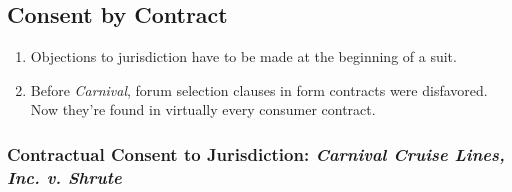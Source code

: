 \subsection{Consent by Contract}

\begin{enumerate}
    \item Objections to jurisdiction have to be made at the beginning of a 
    suit.
    \item Before \emph{Carnival}, forum selection clauses in form contracts 
    were disfavored. Now they're found in virtually every consumer contract.
\end{enumerate}

\subsubsection{Contractual Consent to Jurisdiction: \emph{Carnival Cruise 
Lines, Inc. v. Shrute}}

